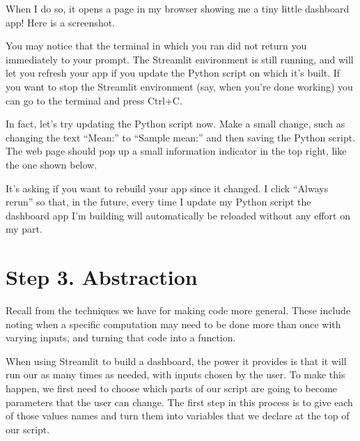 \documentclass[letterpaper,10pt,english]{jupyterBook}
\begin{document}
\sphinxAtStartPar
When I do so, it opens a page in my browser showing me a tiny little dashboard app!  Here is a screenshot.

\sphinxAtStartPar
{}

\sphinxAtStartPar
You may notice that the terminal in which you ran  did not return you immediately to your prompt.  The Streamlit environment is still running, and will let you refresh your app if you update the Python script on which it’s built.  If you want to stop the Streamlit environment (say, when you’re done working) you can go to the terminal and press Ctrl+C.

\sphinxAtStartPar
In fact, let’s try updating the Python script now.  Make a small change, such as changing the text “Mean:” to “Sample mean:” and then saving the Python script.  The web page should pop up a small information indicator in the top right, like the one shown below.

\sphinxAtStartPar
{}

\sphinxAtStartPar
It’s asking if you want to rebuild your app since it changed.  I click “Always rerun” so that, in the future, every time I update my Python script  the dashboard app I’m building will automatically be reloaded without any effort on my part.


\section{Step 3. Abstraction}
\label{\detokenize{chapter-14-dashboards:step-3-abstraction}}
\sphinxAtStartPar
Recall from {\hyperref[\detokenize{chapter-7-abstraction::doc}]{}} the techniques we have for making code more general.  These include noting when a specific computation may need to be done more than once with varying inputs, and turning that code into a function.

\sphinxAtStartPar
When using Streamlit to build a dashboard, the power it provides is that it will run our  as many times as needed, with inputs chosen by the user.  To make this happen, we first need to choose which parts of our script are going to become parameters that the user can change.  The first step in this process is to give each of those values names and turn them into variables that we declare at the top of our script.
\end{document}

